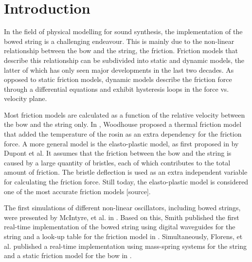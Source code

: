 \documentclass[twoside,a4paper]{article}
\title{\papertitle}
\newif\ifpdf
\begin{document}
\ifpdf %
  \DeclareGraphicsExtensions{.png,.jpg,.pdf, .eps} 
\else  %
\fi

\maketitle

\begin{abstract}
This paper describes the a real-time implementation of the elasto-plastic friction model applied to a stiff string implemented using finite-difference schemes (FDSs). 
\end{abstract}

\section{Introduction}
\label{sec:intro}
In the field of physical modelling for sound synthesis, the implementation of the bowed string is a challenging endeavour. This is mainly due to the non-linear relationship between the bow and the string, the friction. Friction models that describe this relationship can be subdivided into static and dynamic models, the latter of which has only seen major developments in the last two decades. As opposed to static friction models, dynamic models describe the friction force through a differential equations and exhibit hysteresis loops in the force vs. velocity plane.

Most friction models are calculated as a function of the relative velocity between the bow and the string only. In \cite{Woodhouse2003}, Woodhouse proposed a thermal friction model that added the temperature of the rosin as an extra dependency for the friction force. A more general model is the elasto-plastic model, as first proposed in \cite{Dupont2002} by Dupont et al. It assumes that the friction between the bow and the string is caused by a large quantity of bristles, each of which contributes to the total amount of friction. The bristle deflection is used as an extra independent variable for calculating the friction force. Still today, the elasto-plastic model is considered one of the most accurate friction models [source]. 

The first simulations of different non-linear oscillators, including bowed strings, were presented by McIntyre, et al. in \cite{McIntyre1983}. Based on this, Smith published the first real-time implementation of the bowed string using digital waveguides for the string and a look-up table for the friction model in \cite{Smith1986}. Simultaneously, Florens, et al. published a real-time implementation using mass-spring systems for the string and a static friction model for the bow in \cite{Florens1986}.
\end{document}
